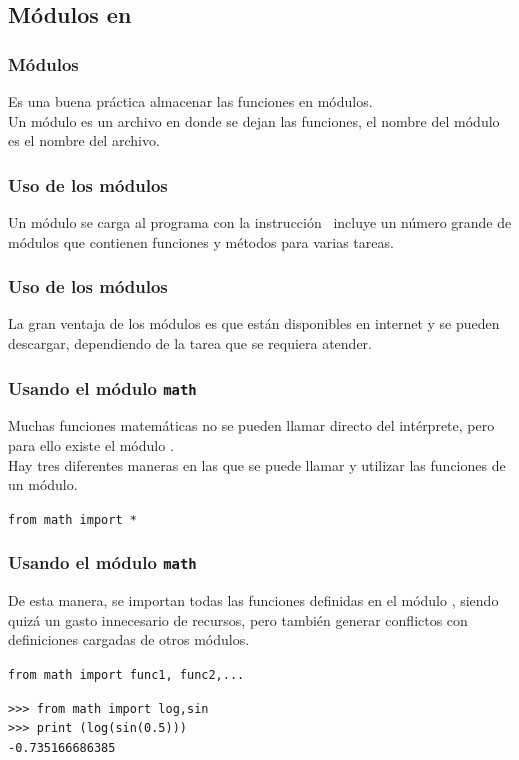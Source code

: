 \subsection{Módulos en \python}
\begin{frame}[fragile]
\frametitle{Módulos}
Es una buena práctica almacenar las funciones en módulos.
\\
\bigskip
Un módulo es un archivo en donde se dejan las funciones, el nombre del módulo es el nombre del archivo.
\end{frame}
\begin{frame}[fragile]
\frametitle{Uso de los módulos}
Un módulo se carga al programa con la instrucción
\python\ incluye un número grande de módulos que contienen funciones y métodos para varias tareas. 
\end{frame}
\begin{frame}[fragile]
\frametitle{Uso de los módulos}
La gran ventaja de los módulos es que están disponibles en internet y se pueden descargar, dependiendo de la tarea que se requiera atender.
\end{frame}
\begin{frame}[fragile]
\frametitle{Usando el módulo \texttt{math}}
Muchas funciones matemáticas no se pueden llamar directo del intérprete, pero para ello existe el módulo .
\\
\bigskip
Hay tres diferentes maneras en las que se puede llamar y utilizar las funciones de un módulo.
\begin{exampleblock}{}
\verb|from math import *|
\end{exampleblock}
\end{frame}
\begin{frame}
\frametitle{Usando el módulo \texttt{math}}
De esta manera, se importan todas las funciones definidas en el módulo , siendo quizá un gasto innecesario de recursos, pero también generar conflictos con definiciones cargadas de otros módulos.
\end{frame}
\begin{frame}[fragile]
\begin{exampleblock}{}
\verb|from math import func1, func2,...|
\end{exampleblock}
\pause
\begin{exampleblock}{}
\verb|>>> from math import log,sin| \\
\verb|>>> print (log(sin(0.5)))| \\
\verb|-0.735166686385|
\end{exampleblock}
\end{frame}
